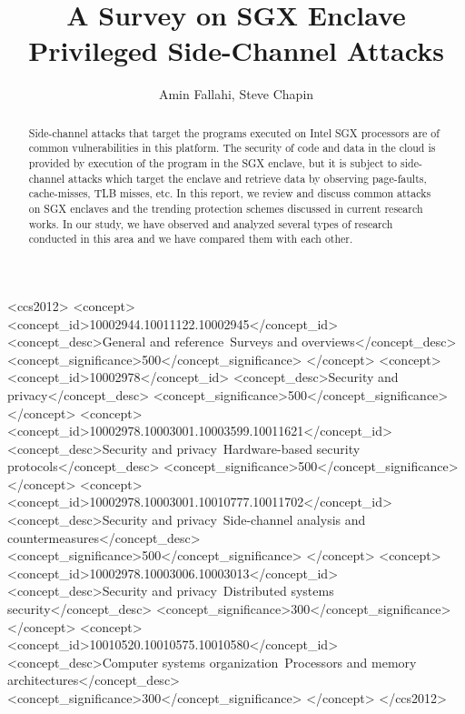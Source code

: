 \documentclass[format=acmsmall, review=false, screen=true]{acmart}
\begin{document}
\title{A Survey on SGX Enclave Privileged Side-Channel Attacks}

\author{Amin Fallahi, Steve Chapin}

\begin{abstract}
Side-channel attacks that target the programs executed on Intel SGX processors are of common vulnerabilities in this platform. The security of code and data in the cloud is provided by execution of the program in the SGX enclave, but it is subject to side-channel attacks which target the enclave and retrieve data by observing page-faults, cache-misses, TLB misses, etc. In this report, we review and discuss common attacks on SGX enclaves and the trending protection schemes discussed in current research works. In our study, we have observed and analyzed several types of research conducted in this area and we have compared them with each other.%
\end{abstract}


%
%
 \begin{CCSXML}
	<ccs2012>
	<concept>
	<concept_id>10002944.10011122.10002945</concept_id>
	<concept_desc>General and reference~Surveys and overviews</concept_desc>
	<concept_significance>500</concept_significance>
	</concept>
	<concept>
	<concept_id>10002978</concept_id>
	<concept_desc>Security and privacy</concept_desc>
	<concept_significance>500</concept_significance>
	</concept>
	<concept>
	<concept_id>10002978.10003001.10003599.10011621</concept_id>
	<concept_desc>Security and privacy~Hardware-based security protocols</concept_desc>
	<concept_significance>500</concept_significance>
	</concept>
	<concept>
	<concept_id>10002978.10003001.10010777.10011702</concept_id>
	<concept_desc>Security and privacy~Side-channel analysis and countermeasures</concept_desc>
	<concept_significance>500</concept_significance>
	</concept>
	<concept>
	<concept_id>10002978.10003006.10003013</concept_id>
	<concept_desc>Security and privacy~Distributed systems security</concept_desc>
	<concept_significance>300</concept_significance>
	</concept>
	<concept>
	<concept_id>10010520.10010575.10010580</concept_id>
	<concept_desc>Computer systems organization~Processors and memory architectures</concept_desc>
	<concept_significance>300</concept_significance>
	</concept>
	</ccs2012>
\end{CCSXML}
\end{document}
